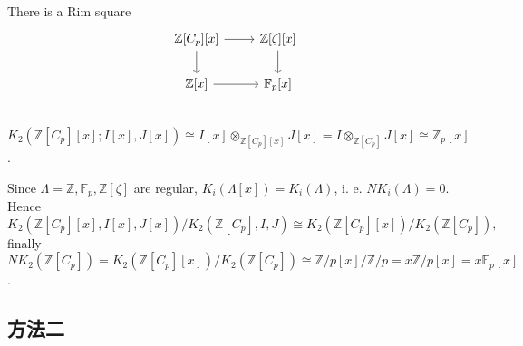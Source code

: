 {\begin{example}[{$\mathbb{Z}[C_p]$}]
\end{example}
\begin{example}[{$\mathbb{Z}[C_p][x]$}]
	There is a Rim square
		\[\begin{tikzcd}
			\mathbb{Z}[C_p][x] \ar[r] \ar[d]& \mathbb{Z}[\zeta][x]\ar[d]\\
			\mathbb{Z}[x] \ar[r] & \mathbb{F}_p[x]\\
		\end{tikzcd}\]
$K_2(\mathbb{Z}[C_p][x];I[x], J[x])\cong I[x]\otimes_{\mathbb{Z}[C_p][x]} J[x] =I\otimes_{\mathbb{Z}[C_p]} J[x]\cong \mathbb{Z}_p[x]$. 

Since $\Lambda=\mathbb{Z}, \mathbb{F}_p, \mathbb{Z}[\zeta]$ are regular, $K_i(\Lambda[x]) = K_i(\Lambda)$, i. e. $NK_i(\Lambda)=0$. Hence 
\[K_2(\mathbb{Z}[C_p][x], I[x], J[x])/K_2(\mathbb{Z}[C_p], I, J)\cong K_2(\mathbb{Z}[C_p][x])/K_2(\mathbb{Z}[C_p]), \]
finally $NK_2(\mathbb{Z}[C_p]) = K_2(\mathbb{Z}[C_p][x])/K_2(\mathbb{Z}[C_p]) \cong \mathbb{Z}/p[x]/\mathbb{Z}/p=x \mathbb{Z}/p [x]= x \mathbb{F}_p[x]$. 
\end{example}
}









\subsection{{\color{red}方法二}}


